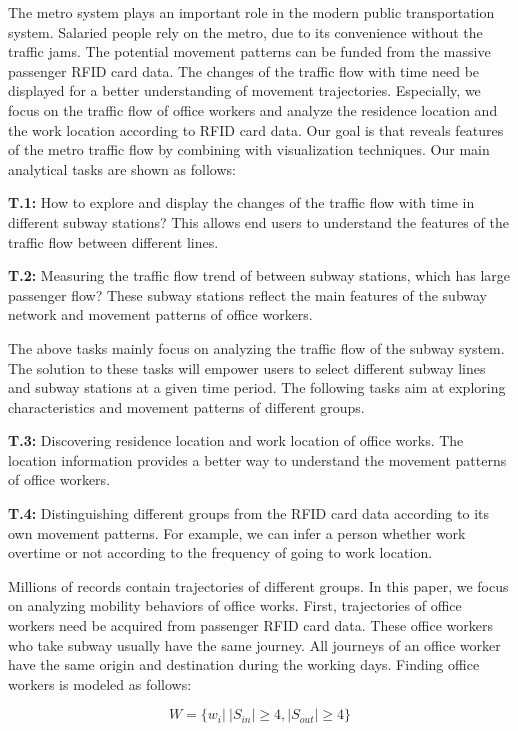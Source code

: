 \documentclass[journal,transmag]{IEEEtran}
\begin{document}
The metro system plays an important role in the modern public transportation system. Salaried people rely on the metro, due to its convenience without the traffic jams. The potential movement patterns can be funded from the massive passenger RFID card data. The changes of the traffic flow with time need be displayed for a better understanding of movement trajectories. Especially, we focus on the traffic flow of office workers and analyze the residence location and the work location according to RFID card data. Our goal is that reveals features of the metro traffic flow by combining with visualization techniques. Our main analytical tasks are shown as follows: 

\textbf{T.1:} How to explore and display the changes of the traffic flow with time in different subway stations? This allows end users to understand the features of the traffic flow between different lines.

\textbf{T.2:} Measuring the traffic flow trend of between subway stations, which has large passenger flow? These subway stations reflect the main features of the subway network and movement patterns of office workers. 

The above tasks mainly focus on analyzing the traffic flow of the subway system. The solution to these tasks will empower users to select different subway lines and subway stations at a given time period. The following tasks aim at exploring characteristics and movement patterns of different groups.

\textbf{T.3:} Discovering residence location and work location of office works. The location information provides a better way to understand the movement patterns of office workers. 

\textbf{T.4:} Distinguishing different groups from the RFID card data according to its own movement patterns. For example, we can infer a person whether work overtime or not according to the frequency of going to work location.


Millions of records contain trajectories of different groups. In this paper, we focus on analyzing mobility behaviors of office works. First, trajectories of office workers need be acquired from passenger RFID card data. These office workers who take subway usually have the same journey. All journeys of an office worker have the same origin and destination during the working days. Finding office workers is modeled as follows:

\begin{equation}
W=\{w_{i}|\ { }|S_{in}|\ge4,|S_{out}|\ge4\}
\end{equation}
\end{document}
